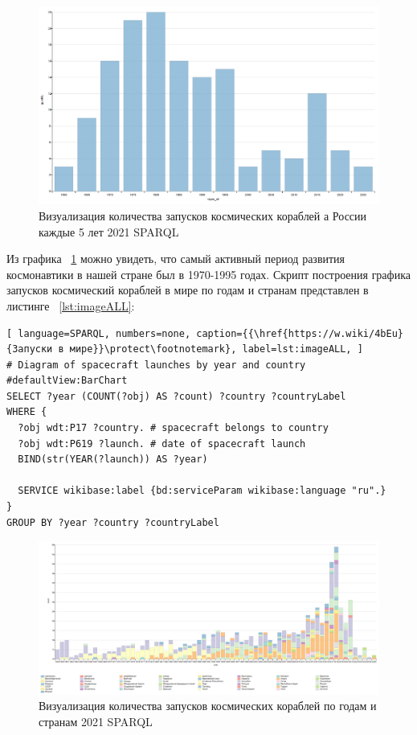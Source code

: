 \begin{figure}[h!]
  \includegraphics[width=\linewidth]{graphics/chapter/spacecraft_space_station/ImgRU.png}
  \caption[График Россия]{Визуализация количества запусков космических кораблей а России каждые 5 лет 2021 SPARQL}%
  \label{fig:ImageRU5}%
\end{figure}

Из графика ~\ref{fig:ImageRU5} можно увидеть, что самый активный период развития космонавтики в нашей стране был в 1970-1995 годах.
Скрипт построения графика запусков космический кораблей в мире по годам и странам представлен в листинге ~\ref{lst:imageALL}:

\begin{lstlisting}[ language=SPARQL, numbers=none, caption={{\href{https://w.wiki/4bEu}{Запуски в мире}}\protect\footnotemark}, label=lst:imageALL, ]
# Diagram of spacecraft launches by year and country
#defaultView:BarChart
SELECT ?year (COUNT(?obj) AS ?count) ?country ?countryLabel
WHERE {
  ?obj wdt:P17 ?country. # spacecraft belongs to country 
  ?obj wdt:P619 ?launch. # date of spacecraft launch
  BIND(str(YEAR(?launch)) AS ?year)
  
  SERVICE wikibase:label {bd:serviceParam wikibase:language "ru".}
}
GROUP BY ?year ?country ?countryLabel
\end{lstlisting}

\begin{figure}[h!]
  \includegraphics[width=\linewidth]{graphics/chapter/spacecraft_space_station/Visualization of the number of spacecraft launches by year and country 2021.png}
  \caption[График мир]{Визуализация количества запусков космических кораблей по годам и странам 2021 SPARQL}%
  \label{fig:ImgALL}%
\end{figure}

